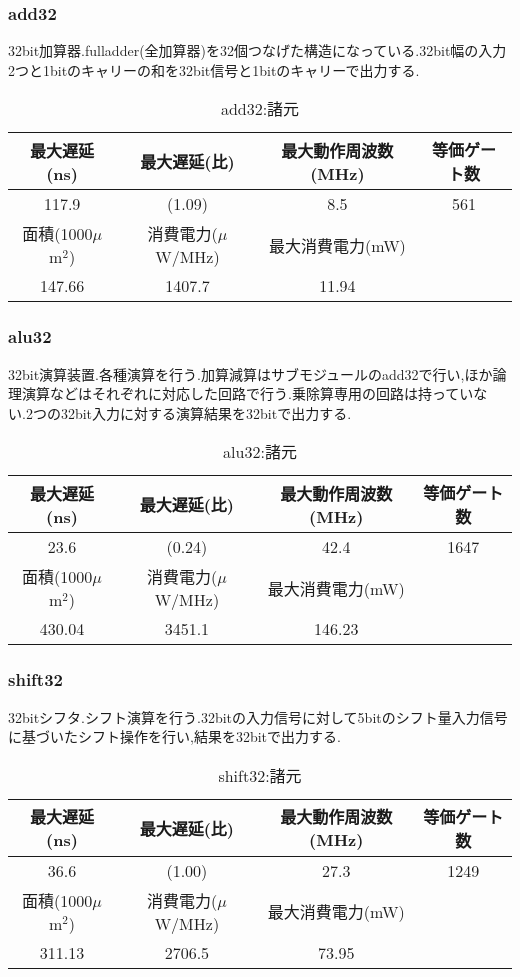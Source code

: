 \documentclass[11pt,a4j]{jarticle}
\begin{document}
\subsubsection{add32}
32bit加算器.fulladder(全加算器)を32個つなげた構造になっている.32bit幅の入力2つと1bitのキャリーの和を32bit信号と1bitのキャリーで出力する.
\begin{table}[htb]
\caption{add32:諸元}
\begin{tabular}{|c|c|c|c|} \hline 
最大遅延(ns) & 最大遅延(比) & 最大動作周波数(MHz) & 等価ゲート数 \\ \hline
117.9 & (1.09) & 8.5 & 561 \\ \hline \hline
面積(1000$\mu$m$^2$) & 消費電力($\mu$W/MHz) & 最大消費電力(mW) & \\ \hline 
147.66 & 1407.7 & 11.94 & \\ \hline 
\end{tabular}
\end{table}
\subsubsection{alu32}
32bit演算装置.各種演算を行う.加算減算はサブモジュールのadd32で行い,ほか論理演算などはそれぞれに対応した回路で行う.乗除算専用の回路は持っていない.2つの32bit入力に対する演算結果を32bitで出力する.
\begin{table}[htb]
\caption{alu32:諸元}
\begin{tabular}{|c|c|c|c|} \hline
 最大遅延(ns) & 最大遅延(比) & 最大動作周波数(MHz) & 等価ゲート数 \\ \hline
23.6 & (0.24) & 42.4 & 1647 \\ \hline \hline
面積(1000$\mu$m$^2$) & 消費電力($\mu$W/MHz) & 最大消費電力(mW) & \\ \hline
430.04 & 3451.1 & 146.23 & \\ \hline
\end{tabular}
\end{table}
\subsubsection{shift32}
32bitシフタ.シフト演算を行う.32bitの入力信号に対して5bitのシフト量入力信号に基づいたシフト操作を行い,結果を32bitで出力する.
\begin{table}[htb]
\caption{shift32:諸元}
\begin{tabular}{|c|c|c|c|} \hline
最大遅延(ns) & 最大遅延(比) & 最大動作周波数(MHz) & 等価ゲート数 \\ \hline
36.6 & (1.00) & 27.3 & 1249 \\ \hline \hline
面積(1000$\mu$m$^2$) & 消費電力($\mu$W/MHz) & 最大消費電力(mW) & \\ \hline
311.13 & 2706.5 & 73.95 & \\ \hline
\end{tabular}
\end{table}
\end{document}
